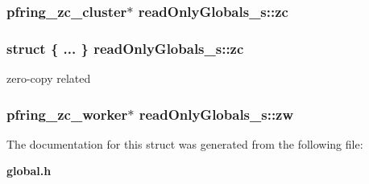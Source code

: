 \subsubsection[{zc}]{\setlength{\rightskip}{0pt plus 5cm}pfring\+\_\+zc\+\_\+cluster$\ast$ read\+Only\+Globals\+\_\+s\+::zc}\label{structread_only_globals__s_a269e34a802b74857cff01946b6fc929a}
\subsubsection[{zc}]{\setlength{\rightskip}{0pt plus 5cm}struct \{ ... \}   read\+Only\+Globals\+\_\+s\+::zc}\label{structread_only_globals__s_ae9e24f762ee7976c1a20d8533345097f}


zero-\/copy related 

\subsubsection[{zw}]{\setlength{\rightskip}{0pt plus 5cm}pfring\+\_\+zc\+\_\+worker$\ast$ read\+Only\+Globals\+\_\+s\+::zw}\label{structread_only_globals__s_a86de855611710a5d5a04cdea948431fb}


The documentation for this struct was generated from the following file\+:\begin{DoxyCompactItemize}
\item 
{\bf global.\+h}\end{DoxyCompactItemize}
